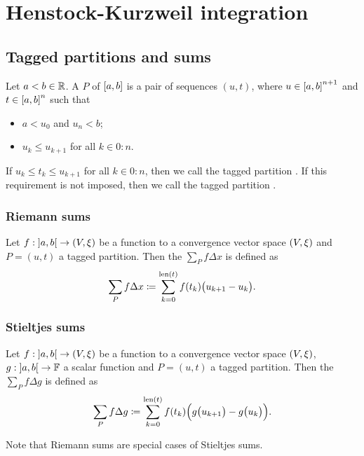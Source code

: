 \section{Henstock-Kurzweil integration}
\subsection{Tagged partitions and sums}
\begin{definition}
Let $a <  b\in \mathbb{R}$. A  $P$ of $\interval{a,b}$ is a pair of sequences $(u,t)$, where $u\in \interval{a,b}^{n+1}$ and $t\in \interval{a,b}^{n}$ such that
\begin{itemize}
\item $a < u_0$ and $u_{n} < b$;
\item $u_{k} \leq u_{k+1}$ for all $k\in 0:n$.
\end{itemize}
If $u_{k} \leq t_k \leq u_{k+1}$ for all $k\in 0:n$, then we call the tagged partition . If this requirement is not imposed, then we call the tagged partition .
\end{definition}

\subsubsection{Riemann sums}
\begin{definition}
Let $f: \interval[o]{a,b}\to \sSet{V,\xi}$ be a function to a convergence vector space $\sSet{V,\xi}$ and $P = (u,t)$ a tagged partition. Then the  $\sum_P f\Delta x$ is defined as
\[ \sum_P f\Delta x \coloneqq \sum_{k = 0}^{\operatorname{len}(t)}f(t_k)\big(u_{k+1} - u_{k}\big). \]
\end{definition}

\subsubsection{Stieltjes sums}
\begin{definition}
Let $f: \interval[o]{a,b}\to \sSet{V,\xi}$ be a function to a convergence vector space $\sSet{V,\xi}$, $g: \interval[o]{a,b}\to \F$ a scalar function and $P = (u,t)$ a tagged partition. Then the  $\sum_P f\Delta g$ is defined as
\[ \sum_P f \Delta g \coloneqq \sum_{k = 0}^{\operatorname{len}(t)}f(t_k)\Big(g\big(u_{k+1}\big) - g\big(u_{k}\big)\Big). \]
\end{definition}
Note that Riemann sums are special cases of Stieltjes sums.

